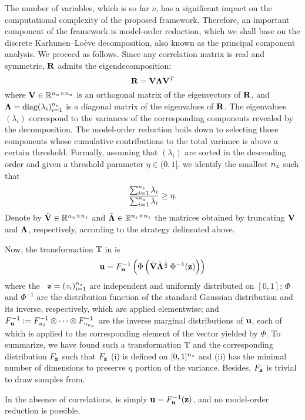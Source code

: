 The number of variables, which is so far $\nu$, has a significant impact on the
computational complexity of the proposed framework. Therefore, an important
component of the framework is model-order reduction, which we shall base on the
discrete Karhunen--Lo\`{e}ve decomposition, also known as the principal
component analysis. We proceed as follows. Since any correlation matrix is real
and symmetric, $\mathbf{R}$ admits the eigendecomposition:
\[
  \mathbf{R} = \mathbf{V} \mathbf{\Lambda} \mathbf{V}^T
\]
where $\mathbf{V} \in \mathbb{R}^{{n_u} \times {n_u}}$ is an orthogonal matrix of the
eigenvectors of $\mathbf{R}$, and $\mathbf{\Lambda} = \text{diag}(\lambda_i)_{i = 1}^{n_u}$
is a diagonal matrix of the eigenvalues of $\mathbf{R}$. The eigenvalues
$(\lambda_i)$ correspond to the variances of the corresponding components
revealed by the decomposition. The model-order reduction boils down to selecting
those components whose cumulative contributions to the total variance is above a
certain threshold. Formally, assuming that $(\lambda_i)$ are sorted in the
descending order and given a threshold parameter $\eta \in (0, 1]$, we identify
the smallest ${n_z}$ such that
\[
  \frac{\sum_{i = 1}^{n_z} \lambda_i}{\sum_{i = 1}^{n_u} \lambda_i} \geq \eta.
\]
Denote by $\tilde{\mathbf{V}} \in \mathbb{R}^{{n_u} \times {n_z}}$ and $\tilde{\mathbf{\Lambda}}
\in\mathbb{R}^{{n_z} \times {n_z}}$ the matrices obtained by truncating $\mathbf{V}$ and
$\mathbf{\Lambda}$, respectively, according to the strategy delineated above.

Now, the transformation $\mathbb{T}$ in  is
\begin{equation} \elab{transformation}
  \vu = \distribution_\vu^{-1} \left( \Phi\left( \tilde{\m{V}} \tilde{\m{\Lambda}}^\frac{1}{2} \, \Phi^{-1}(\vz) \right) \right)
\end{equation}
where the \rvs\ $\mathbf{z} = (z_i)_{i = 1}^{n_z}$ are independent and uniformly
distributed on $[0, 1]$; $\Phi$ and $\Phi^{-1}$ are the distribution function of
the standard Gaussian distribution and its inverse, respectively, which are
applied elementwise; and $F_{\mathbf{u}}^{-1} := F_{u_1}^{-1}
\otimes \cdots \otimes F_{u_{n_z}}^{-1}$ are the inverse marginal
distributions of $\mathbf{u}$, each of which is applied to the corresponding element of
the vector yielded by $\Phi$. To summarize, we have found such a transformation
$\mathbb{T}$ and the corresponding distribution $F_{\mathbf{z}}$ such
that $F_{\mathbf{z}}$ (i) is defined on $[0, 1]^{n_z}$ and (ii) has the minimal
number of dimensions to preserve $\eta$ portion of the variance. Besides,
$F_{\mathbf{z}}$ is trivial to draw samples from.

\begin{remark}
  In the absence of correlations,  is simply $\mathbf{u} =
  F_{\mathbf{u}}^{-1}(\mathbf{z})$, and no model-order reduction is possible.
\end{remark}
